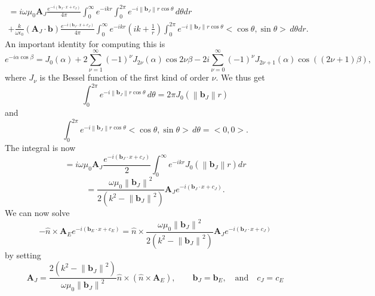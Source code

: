 \documentclass{article}
\newcommand{\norm}[1]{\left\lVert #1 \right\rVert}
\theoremstyle{plain}
\begin{document}
\begin{multline}
	=i\omega\mu_0 \mathbf{A}_J\frac{e^{-i(\mathbf{b}_J\cdot x + c_J)}}{4\pi}
	\int_0^\infty e^{-ikr} \int_0^{2\pi} e^{-i\norm{\mathbf{b}_J}r\cos{\theta}} \,d\theta dr \\
	+ \frac{k}{\omega\epsilon_0}(\mathbf{A}_J\cdot\mathbf{b})\frac{e^{-i(\mathbf{b}_J\cdot x + c_J)}}{4\pi}
	\int_0^\infty e^{-ikr}\left( ik + \frac{1}{r} \right) \int_0^{2\pi} e^{-i\norm{\mathbf{b}_J}r\cos{\theta}} <\cos{\theta},\sin{\theta}> \,d\theta dr.
\end{multline}
An important identity for computing this is
\begin{equation}
	e^{-i\alpha\cos{\beta}}
	= J_0(\alpha) + 2\sum_{\nu=1}^\infty (-1)^\nu J_{2\nu}(\alpha)\cos{2\nu\beta} 
	- 2i\sum_{\nu=0}^\infty (-1)^\nu J_{2\nu+1}(\alpha)\cos{\left((2\nu+1)\beta\right)},
\end{equation}
where $J_\nu$ is the Bessel function of the first kind of order $\nu$.
We thus get
\begin{equation}
	\int_0^{2\pi} e^{-i\norm{\mathbf{b}_J}r\cos{\theta}} \,d\theta = 2\pi J_0(\norm{\mathbf{b}_J}r)
\end{equation}
and
\begin{equation}
	\int_0^{2\pi} e^{-i\norm{\mathbf{b}_J}r\cos{\theta}} <\cos{\theta},\sin{\theta}> \,d\theta = <0,0>.
\end{equation}
The integral is now
\begin{equation}
	=i\omega\mu_0 \mathbf{A}_J\frac{e^{-i(\mathbf{b}_J\cdot x + c_J)}}{2}
	\int_0^\infty e^{-ikr} J_0(\norm{\mathbf{b}_J}r) dr
\end{equation}
\begin{equation}
	= \frac{\omega\mu_0\norm{\mathbf{b}_J}^2}{2\left(k^2 - \norm{\mathbf{b}_J}^2\right)} \mathbf{A}_J e^{-i(\mathbf{b}_J\cdot x + c_J)}.
\end{equation}
We can now solve
\begin{equation}
	-\hat{n}\times\mathbf{A}_E e^{-i(\mathbf{b}_E\cdot x + c_E)}
	= \hat{n}\times\frac{\omega\mu_0\norm{\mathbf{b}_J}^2}{2\left(k^2 - \norm{\mathbf{b}_J}^2\right)} \mathbf{A}_J e^{-i(\mathbf{b}_J\cdot x + c_J)}
\end{equation}
by setting
\begin{equation}
	\mathbf{A}_J = \frac{2\left(k^2 - \norm{\mathbf{b}_J}^2\right)}{\omega\mu_0\norm{\mathbf{b}_J}^2} \hat{n}\times( \hat{n}\times\mathbf{A}_E ),
	\quad\quad \mathbf{b}_J = \mathbf{b}_E,
	\quad\text{and}\quad c_J = c_E
\end{equation}
\end{document}
